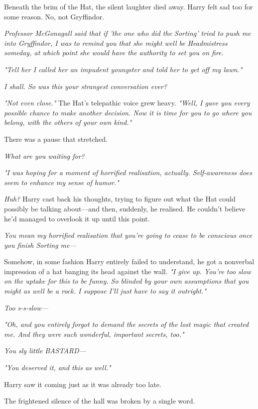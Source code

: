 Beneath the brim of the Hat, the silent laughter died away. Harry felt sad too 
for some reason. No, not Gryffindor.

\emph{Professor McGonagall said that if 'the one who did the Sorting' tried to 
push me into Gryffindor, I was to remind you that she might well be 
Headmistress someday, at which point she would have the authority to set you on 
fire.}

\emph{"Tell her I called her an impudent youngster and told her to get off my 
lawn."}

\emph{I shall. So was this your strangest conversation ever?}

\emph{"Not even close."} The Hat's telepathic voice grew heavy.\emph{ "Well, I 
gave you every possible chance to make another decision. Now it is time for you 
to go where you belong, with the others of your own kind."}

There was a pause that stretched.

\emph{What are you waiting for?}

\emph{"I was hoping for a moment of horrified realisation, actually. 
Self-awareness does seem to enhance my sense of humor."}

\emph{Huh?} Harry cast back his thoughts, trying to figure out what the Hat 
could possibly be talking about---and then, suddenly, he realised. He couldn't 
believe he'd managed to overlook it up until this point.

\emph{You mean my horrified realisation that you're going to cease to be 
conscious once you finish Sorting me---}

Somehow, in some fashion Harry entirely failed to understand, he got a 
nonverbal impression of a hat banging its head against the wall. \emph{"I give 
up. You're too slow on the uptake for this to be funny. So blinded by your own 
assumptions that you might as well be a rock. I suppose I'll just have to say 
it outright."}

\emph{Too s-s-slow---}

\emph{"Oh, and you entirely forgot to demand the secrets of the lost magic that 
created me. And they were such wonderful, important secrets, too."}

\emph{You sly little BASTARD---}

\emph{"You deserved it, and this as well."}

Harry saw it coming just as it was already too late.

The frightened silence of the hall was broken by a single word.

